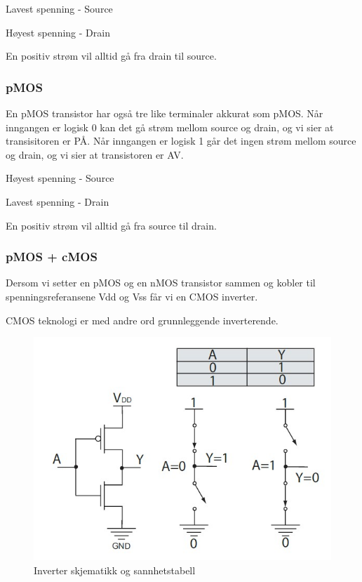 \documentclass{article}
\begin{document}
	Lavest spenning - Source
	
	Høyest spenning - Drain
	
	En positiv strøm vil alltid gå fra drain til source.
	
	\subsubsection{pMOS}
	
	En pMOS transistor har også tre like terminaler akkurat som pMOS. Når inngangen er logisk 0 kan det gå strøm mellom source og drain, og vi sier at transisitoren er PÅ. Når inngangen er logisk 1 går det ingen strøm mellom source og drain, og vi sier at transistoren er AV.
	
	Høyest spenning - Source
	
	Lavest spenning - Drain
	
	En positiv strøm vil alltid gå fra source til drain.
	
	\subsubsection{pMOS + cMOS}
	
	Dersom vi setter en pMOS og en nMOS transistor sammen og kobler til spenningsreferansene Vdd og Vss får vi en CMOS inverter.
	
	CMOS teknologi er med andre ord grunnleggende inverterende.
	
	\begin{figure}[H]
		\includegraphics[scale = 0.6]{CMOSinv.jpg}
		\caption{Inverter skjematikk og sannhetstabell}
	\end{figure}
		
\end{document}
